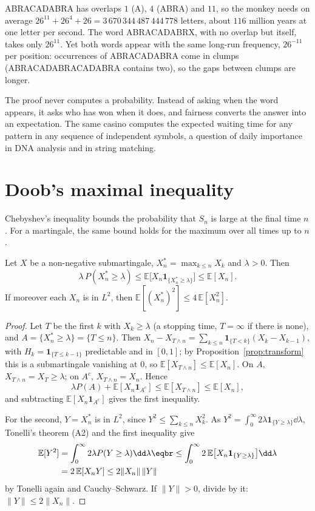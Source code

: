 ABRACADABRA has overlaps $1$ (A), $4$ (ABRA) and $11$, so the monkey needs on average $26^{11}+26^4+26=3\,670\,344\,487\,444\,778$ letters, about
$116$ million years at one letter per second. The word ABRACADABRX, with no overlap but itself, takes only $26^{11}$.
Yet both words appear with the same long-run frequency, $26^{-11}$ per position: occurrences of ABRACADABRA come in clumps
(ABRACADABRACADABRA contains two), so the gaps between clumps are longer.

\begin{beauty}
The proof never computes a probability. Instead of asking when the word appears, it asks who has won when it does, and
fairness converts the answer into an expectation. The same casino computes the expected waiting time for any pattern
in any sequence of independent symbols, a question of daily importance in DNA analysis and in string matching.
\end{beauty}

\section{Doob's maximal inequality}

Chebyshev's inequality bounds the probability that $S_n$ is large at the final time $n$. For a martingale, the same bound holds
for the maximum over all times up to $n$.

\begin{theorem}\label{thm:doob}
Let $X$ be a non-negative submartingale, $X^*_n=\max_{k\le n}X_k$ and $\lambda>0$. Then
\[
\lambda\,P(X_n^*\ge\lambda)\le\mathbb E\bigl[X_n\mathbf 1_{\{X^*_n\ge\lambda\}}\bigr]\le\mathbb E[X_n].
\]
If moreover each $X_n$ is in $L^2$, then $\mathbb E[(X^*_n)^2]\le4\,\mathbb E[X_n^2]$.
\end{theorem}
\begin{proof}
Let $T$ be the first $k$ with $X_k\ge\lambda$ (a stopping time, $T=\infty$ if there is none), and $A=\{X^*_n\ge\lambda\}=\{T\le n\}$. Then $X_n-X_{T\wedge n}=\sum_{k\le n}\mathbf 1_{\{T<k\}}(X_k-X_{k-1})$,
with $H_k=\mathbf 1_{\{T\le k-1\}}$ predictable and in $[0,1]$; by Proposition~\ref{prop:transform} this is a submartingale vanishing at $0$, so $\mathbb E[X_{T\wedge n}]\le\mathbb E[X_n]$.
On $A$, $X_{T\wedge n}=X_T\ge\lambda$; on $A^c$, $X_{T\wedge n}=X_n$. Hence
\[
\lambda P(A)+\mathbb E[X_n\mathbf 1_{A^c}]\le\mathbb E[X_{T\wedge n}]\le\mathbb E[X_n],
\]
and subtracting $\mathbb E[X_n\mathbf 1_{A^c}]$ gives the first inequality.

For the second, $Y=X^*_n$ is in $L^2$, since $Y^2\le\sum_{k\le n}X_k^2$. As $Y^2=\int_0^\infty2\lambda\mathbf 1_{\{Y\ge\lambda\}}\dd\lambda$, Tonelli's theorem (A2) and the first inequality give
\[
\begin{aligned}\mathbb E[Y^2]&=\int_0^\infty2\lambda P(Y\ge\lambda)\dd\lambda\eqbr\le\int_0^\infty2\,\mathbb E\bigl[X_n\mathbf 1_{\{Y\ge\lambda\}}\bigr]\dd\lambda\\&=2\,\mathbb E[X_nY]\le2\|X_n\|\,\|Y\|\end{aligned}
\]
by Tonelli again and Cauchy--Schwarz. If $\|Y\|>0$, divide by it: $\|Y\|\le2\|X_n\|$.
\end{proof}

